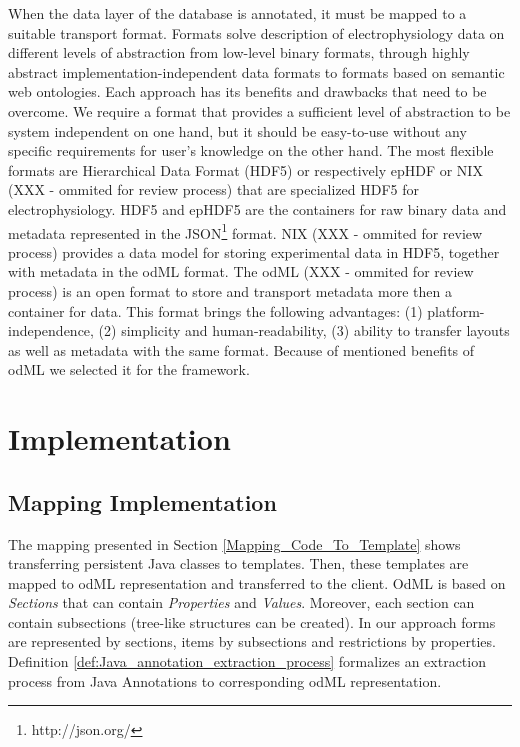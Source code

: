 \documentclass[a4paper,twoside]{article}
\begin{document}
When the data layer of the database is annotated, it must be mapped to a suitable transport format. Formats solve description of electrophysiology data on different levels of abstraction from low-level binary formats, through highly abstract implementation-independent data formats to formats based on semantic web ontologies. Each approach has its benefits and drawbacks that need to be overcome. We require a format that provides a sufficient level of abstraction to be system independent on one hand, but it should be easy-to-use without any specific requirements for user's knowledge on the other hand. The most flexible formats are Hierarchical Data Format (HDF5) \cite{hdf5} or respectively epHDF or NIX (XXX - ommited for review process) that are specialized HDF5 for electrophysiology. HDF5 and epHDF5 are the containers for raw binary data and metadata represented in the JSON\footnote{http://json.org/} format. NIX (XXX - ommited for review process) provides a data model for storing experimental data in HDF5, together with metadata in the odML format. The odML (XXX - ommited for review process) is an open format to store and transport metadata more then a container for data. This format brings the following advantages: (1) platform-independence, (2) simplicity and human-readability, (3) ability to transfer layouts as well as metadata with the same format. Because of mentioned benefits of odML we selected it for the framework.



\section{Implementation}


\subsection{Mapping Implementation}


The mapping presented in Section \ref{Mapping_Code_To_Template} shows transferring persistent Java classes to templates. Then, these templates are mapped to odML representation and transferred to the client. OdML is based on \textit{Sections} that can contain \textit{Properties} and \textit{Values}. Moreover, each section can contain subsections (tree-like structures can be created). In our approach forms are represented by sections, items by subsections and restrictions by properties. Definition \ref{def:Java_annotation_extraction_process} formalizes an extraction process from Java Annotations to corresponding odML representation.
\end{document}
